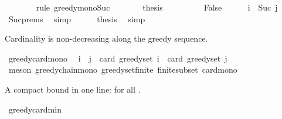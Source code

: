 \begin{isabellebody}
\ \ \ \ \ \ \isamarkupfalse%
\ {\isacharparenleft}{\kern0pt}rule\ greedy{\isacharunderscore}{\kern0pt}mono{\isacharunderscore}{\kern0pt}Suc{\isacharparenright}{\kern0pt}\isanewline
\ \ \ \ \isamarkupfalse%
\ \isamarkupfalse%
\ {\isacharquery}{\kern0pt}thesis\ \isakeywordONE{{\isachardot}{\kern0pt}}\isamarkupfalse%
\isanewline
\ \ \isamarkupfalse%
\isanewline
\ \ \ \ \isamarkupfalse%
\ False\isanewline
\ \ \ \ \isamarkupfalse%
\ {\isachardoublequoteopen}i\ {\isacharequal}{\kern0pt}\ Suc\ j{\isachardoublequoteclose}\ \isamarkupfalse%
\ Suc{\isachardot}{\kern0pt}prems\ \isamarkupfalse%
\ simp\isanewline
\ \ \ \ \isamarkupfalse%
\ {\isacharquery}{\kern0pt}thesis\ \isamarkupfalse%
\ simp\isanewline
\ \ \isamarkupfalse%
\isanewline
{}\isamarkupfalse%
%
\endisatagproof
{\isafoldproof}%
%
\isadelimproof
%
\endisadelimproof
%
\begin{isamarkuptext}%
Cardinality is non-decreasing along the greedy sequence.%
\end{isamarkuptext}\isamarkuptrue%
\isamarkupfalse%
\ greedy{\isacharunderscore}{\kern0pt}card{\isacharunderscore}{\kern0pt}mono{\isacharcolon}{\kern0pt}\isanewline
\ \ {\isachardoublequoteopen}i\ {\isasymle}\ j\ {\isasymLongrightarrow}\ card\ {\isacharparenleft}{\kern0pt}greedy{\isacharunderscore}{\kern0pt}set\ i{\isacharparenright}{\kern0pt}\ {\isasymle}\ card\ {\isacharparenleft}{\kern0pt}greedy{\isacharunderscore}{\kern0pt}set\ j{\isacharparenright}{\kern0pt}{\isachardoublequoteclose}\isanewline
%
\isadelimproof
\ \ %
\endisadelimproof
%
\isatagproof
{}\isamarkupfalse%
\ {\isacharparenleft}{\kern0pt}meson\ greedy{\isacharunderscore}{\kern0pt}chain{\isacharunderscore}{\kern0pt}mono\ greedy{\isacharunderscore}{\kern0pt}set{\isacharunderscore}{\kern0pt}finite\ finite{\isacharunderscore}{\kern0pt}subset\ card{\isacharunderscore}{\kern0pt}mono{\isacharparenright}{\kern0pt}%
\endisatagproof
{\isafoldproof}%
%
\isadelimproof
%
\endisadelimproof
%
\begin{isamarkuptext}%
A compact bound in one line:  for all .%
\end{isamarkuptext}\isamarkuptrue%
\isamarkupfalse%
\ greedy{\isacharunderscore}{\kern0pt}card{\isacharunderscore}{\kern0pt}min{\isacharcolon}{\kern0pt}\isanewline

\end{isabellebody}
